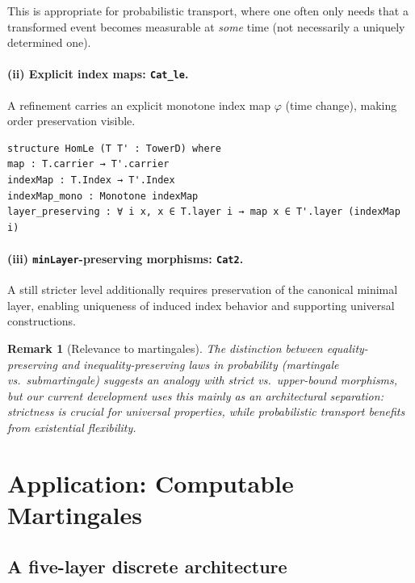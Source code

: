 \documentclass[11pt]{article}
\newtheorem{remark}{Remark}
\begin{document}
This is appropriate for probabilistic transport, where one often only needs that a transformed event becomes measurable at \emph{some} time (not necessarily a uniquely determined one). %

\paragraph{(ii) Explicit index maps: \texttt{Cat_le}.}
A refinement carries an explicit monotone index map $\varphi$ (time change), making order preservation visible.

\begin{lstlisting}[language={},caption={Lean skeleton: \texttt{Cat_le} morphism}]
structure HomLe (T T' : TowerD) where
map : T.carrier → T'.carrier
indexMap : T.Index → T'.Index
indexMap_mono : Monotone indexMap
layer_preserving : ∀ i x, x ∈ T.layer i → map x ∈ T'.layer (indexMap i)
\end{lstlisting}

\paragraph{(iii) \texttt{minLayer}-preserving morphisms: \texttt{Cat2}.}
A still stricter level additionally requires preservation of the canonical minimal layer, enabling uniqueness of induced index behavior and supporting universal constructions. %

\begin{remark}[Relevance to martingales]
The distinction between equality-preserving and inequality-preserving laws in probability (martingale vs.\ submartingale) suggests an analogy with strict vs.\ upper-bound morphisms, but our current development uses this mainly as an \emph{architectural} separation: strictness is crucial for universal properties, while probabilistic transport benefits from existential flexibility. %
\end{remark}

\section{Application: Computable Martingales}

\subsection{A five-layer discrete architecture}
\end{document}
